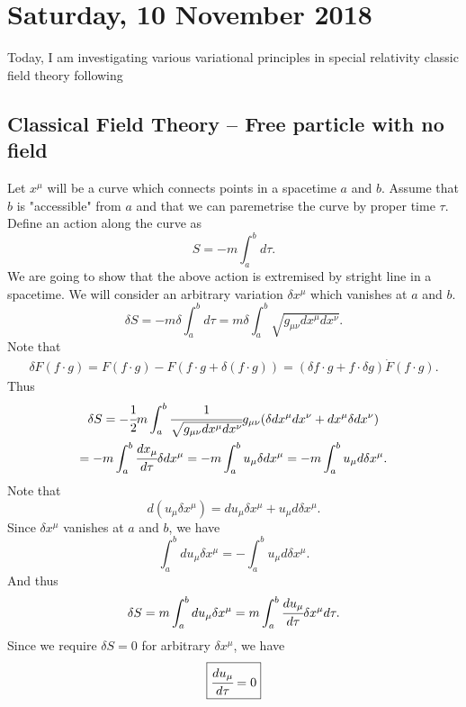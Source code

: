 \documentclass[main.tex]{subfiles}
\begin{document}
\section{Saturday, 10 November 2018}
Today, I am investigating various variational principles in special relativity classic field theory following \cite[17 The Classical Theory of Fields]{shepherd2013}
\subsection{Classical Field Theory -- Free particle with no field}
\label{classic-field-free-particle}
Let $x^\mu$ will be a curve which connects points in a spacetime $a$ and $b$. Assume that $b$ is "accessible" from $a$ and that we can paremetrise the curve by proper time $\tau$. Define an action along the curve as
\begin{equation}
S = -m\int_a^b d\tau.
\end{equation}
We are going to show that the above action is extremised by stright line in a spacetime. We will consider an arbitrary variation $\delta x^\mu$ which vanishes at $a$ and $b$.
\begin{equation}
\delta S = -m\delta\int_a^b d\tau = m\delta\int_a^b \sqrt{g_{\mu\nu} dx^\mu dx^\nu}. 
\end{equation}
Note that 
\begin{multline}
\delta F(f\cdot g) = F(f\cdot g) - F(f\cdot g + \delta(f\cdot g)) = (\delta f \cdot g + f \cdot\delta g)\dot{F}(f\cdot g).
\end{multline}
Thus
\begin{multline}
\delta S = -\cfrac{1}{2} m \int_a^b \cfrac{1}{\sqrt{g_{\mu\nu} dx^\mu dx^\nu}} g_{\mu\nu}(\delta dx^\mu dx^\nu + dx^\mu \delta dx^\nu)\\ = -m\int_a^b \cfrac{dx_\mu}{d\tau} \delta dx^\mu = -m\int_a^b u_\mu \delta dx^\mu = -m\int_a^b u_\mu d\delta x^\mu.
\end{multline}
Note that
\begin{equation}
d(u_\mu \delta x^\mu) = du_\mu \delta x^\mu + u_\mu d\delta x^\mu.
\end{equation}
Since $\delta x^\mu$ vanishes at $a$ and $b$, we have
\begin{equation}
\int_a^b du_\mu \delta x^\mu = -\int_a^b u_\mu d\delta x^\mu.
\end{equation}
And thus
\begin{equation}
\label{free-srt-action}
\delta S = m\int_a^b du_\mu \delta x^\mu = m\int_a^b \cfrac{du_\mu}{d\tau} \delta x^\mu d\tau.
\end{equation}
Since we require $\delta S = 0$ for arbitrary $\delta x^\mu$, we have
\begin{equation}
\boxed{
\cfrac{du_\mu}{d\tau} = 0}
\end{equation}
\end{document}
